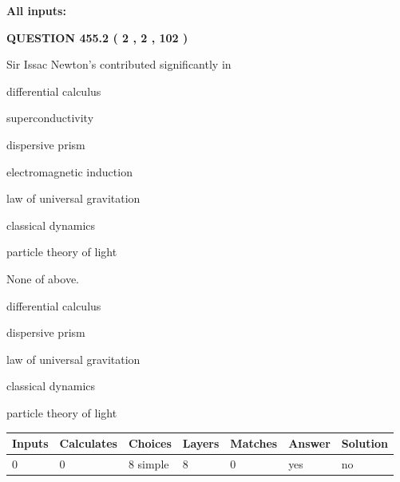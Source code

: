 \documentclass[12pt]{article}
\begin{document}
   
   
   
\noindent{}
   
   
   
   
\noindent\vspace{0.1in}\hspace{-0.08in} {\textbf{\Large{All inputs: }}}
   
   
  
\vspace{0.2in}
  
{\textbf{\Large{QUESTION
455.2 
 ( 2 , 2 , 102 )
}}}
  
  
Sir Issac Newton's contributed significantly in
 
 
differential calculus
 
 
superconductivity
 
 
dispersive prism
 
 
electromagnetic induction
 
 
law of universal gravitation
 
 
classical dynamics
 
 
particle theory of light
 
 
 None of above.
 
 
\noindent{}
 
 
differential calculus
 
 
dispersive prism
 
 
law of universal gravitation
 
 
classical dynamics
 
 
particle theory of light
 
 
\noindent{}
 
 
   
   
   
   
\noindent\begin{tabular}{|l|l|l|l|l|l|l|}
 \hline
Inputs & Calculates & Choices & Layers & Matches & Answer & Solution \\ \hline
 0  & 
 0  & 
 8
  simple  
  & 
 8  & 
 0  & 
  yes & 
  no 
  \\ \hline
 \end{tabular}
   
\end{document}
